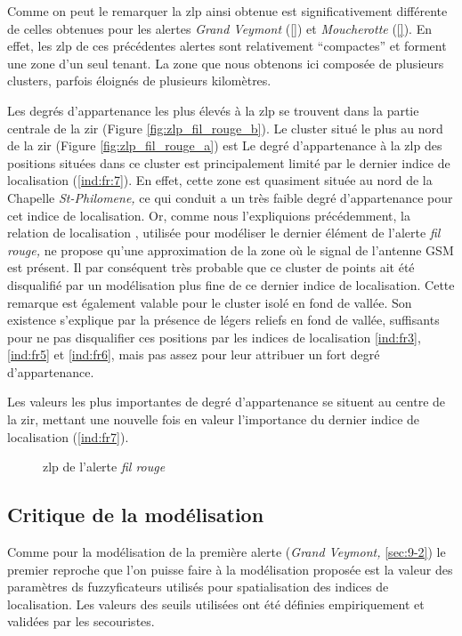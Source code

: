 Comme on peut le remarquer la \ac{zlp} ainsi obtenue est
significativement différente de celles obtenues pour les alertes
\emph{Grand Veymont} (\autoref{}) et \emph{Moucherotte}
(\autoref{}). En effet, les \ac{zlp} de ces précédentes alertes sont
relativement \enquote{compactes} et forment une zone d'un seul
tenant. La zone que nous obtenons ici composée de plusieurs clusters,
parfois éloignés de plusieurs kilomètres.

Les degrés d'appartenance les plus élevés à la \ac{zlp} se trouvent
dans la partie centrale de la \ac{zir} (Figure
\ref{fig:zlp_fil_rouge_b}).
%
Le cluster situé le plus au nord de la \ac{zir} (Figure
\ref{fig:zlp_fil_rouge_a}) est
%
Le degré d'appartenance à la \ac{zlp} des positions situées dans ce
cluster est principalement limité par le dernier indice de
localisation (\ref{ind:fr:7}). En effet, cette zone est quasiment
située au nord de la Chapelle \emph{St-Philomene,} ce qui conduit a un
très faible degré d’appartenance pour cet indice de localisation. Or,
comme nous l'expliquions précédemment, la relation de localisation
, utilisée pour modéliser le dernier élément de
l'alerte \emph{fil rouge,} ne propose qu'une approximation de la zone
où le signal de l'antenne GSM est présent. Il par conséquent très
probable que ce cluster de points ait été disqualifié par un
modélisation plus fine de ce dernier indice de localisation. Cette
remarque est également valable pour le cluster isolé en fond de
vallée. Son existence s'explique par la présence de légers reliefs en
fond de vallée, suffisants pour ne pas disqualifier ces positions par
les indices de localisation \ref{ind:fr3}, \ref{ind:fr5} et
\ref{ind:fr6}, mais pas assez pour leur attribuer un fort degré
d'appartenance.

Les valeurs les plus importantes de degré d'appartenance se situent au
centre de la \ac{zir}, mettant une nouvelle fois en valeur
l'importance du dernier indice de localisation (\ref{ind:fr7}).

\begin{figure}
  \centering
  
  \caption{\ac{zlp} de l'alerte \emph{fil rouge}}
  \label{fig:zlp_fil_rouge}
\end{figure}

\subsection{Critique de la modélisation}
\label{subsec:9-4-3}

Comme pour la modélisation de la première alerte (\emph{Grand
  Veymont,} \autoref{sec:9-2}) le premier reproche que l'on puisse
faire à la modélisation proposée est la valeur des paramètres ds
fuzzyficateurs utilisés pour spatialisation des indices de
localisation. Les valeurs des seuils utilisées ont été définies
empiriquement et validées par les secouristes.




